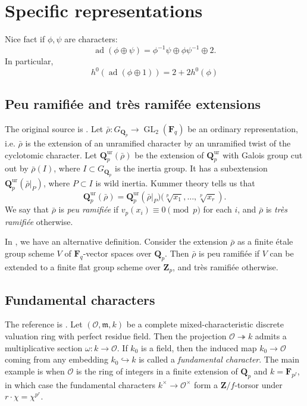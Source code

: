 \documentclass{amsart}
\DeclareMathOperator{\adjoint}{ad}
\DeclareMathOperator{\GL}{GL}
\newcommand{\cO}{\mathcal{O}}
\newcommand{\dF}{\mathbf{F}}
\newcommand{\dQ}{\mathbf{Q}}
\newcommand{\dZ}{\mathbf{Z}}
\newcommand{\fm}{\mathfrak{m}}
\begin{document}
\section{Specific representations}

Nice fact if $\phi,\psi$ are characters: 
\[
  \adjoint(\phi\oplus \psi) = \phi^{-1}\psi\oplus \phi\psi^{-1}\oplus 2 .
\]
In particular, 
\[
  h^0(\adjoint(\phi\oplus 1)) = 2+2 h^0(\phi)
\]


\subsection{Peu ramifi\'ee and tr\`es ramif\'ee extensions}

The original source is \cite[2.4.6]{serre-1987}. 
Let $\bar\rho:G_{\dQ_p}\to \GL_2(\dF_q)$ be 
an ordinary representation, i.e. $\bar\rho$ is the extension of an unramified 
character by an unramified twist of the cyclotomic character. Let 
$\dQ_p^\mathrm{ur}(\bar\rho)$ be the extension of $\dQ_p^\mathrm{ur}$ with 
Galois group cut out by $\bar\rho(I)$, where $I\subset G_{\dQ_p}$ is the 
inertia group. It has a subextension $\dQ_p^\mathrm{ur}(\bar\rho|_P)$, where 
$P\subset I$ is wild inertia. Kummer theory tells us that 
\[
  \dQ_p^\mathrm{ur}(\bar\rho) = \dQ_p^\mathrm{ur}\left(\bar\rho|_P)(\sqrt[p]{x_1},\dots,\sqrt[p]{x_r}\right).
\]
We say that $\bar\rho$ is \emph{peu ramifi\'ee} if $v_p(x_i)\equiv 0\pmod p$ 
for each $i$, and $\bar\rho$ is \emph{tr\`es ramifi\'ee} otherwise. 

In \cite[8.2]{edixhoven-1992}, we have an alternative definition. Consider the 
extension $\bar\rho$ as a finite \'etale group scheme $V$ of $\dF_q$-vector 
spaces over $\dQ_p$. Then $\bar\rho$ is peu ramifi\'ee if $V$ can be extended 
to a finite flat group scheme over $\dZ_p$, and tr\`es ramifi\'ee otherwise. 


\subsection{Fundamental characters}

The reference is \cite[4.4]{tate-1995}.
Let $(\cO,\fm,k)$ be a complete mixed-characteristic discrete valuation ring 
with perfect residue field. Then the projection $\cO\twoheadrightarrow k$ 
admits a multiplicative section $\omega:k\to \cO$. If $k_0$ is a field, then 
the induced map $k_0\to \cO$ coming from any embedding $k_0\hookrightarrow k$ 
is called a \emph{fundamental character}. The main example is when $\cO$ is the 
ring of integers in a finite extension of $\dQ_p$ and 
$k=\dF_{p^f}$, in which case the fundamental characters 
$k^\times\to \cO^\times$ form a $\dZ/f$-torsor under 
$r\cdot \chi = \chi^{p^r}$. 
\end{document}
